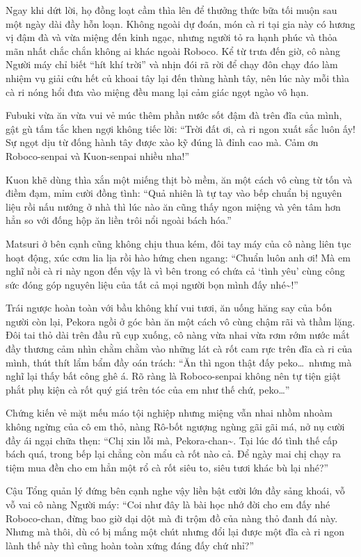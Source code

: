 \documentclass[../main.tex]{subfiles}
\begin{document}
Ngay khi dứt lời, họ đồng loạt cầm thìa lên để thưởng thức bữa tối muộn sau một ngày dài đầy hỗn loạn. Không ngoài dự đoán, món cà ri tại gia này có hương vị đậm đà và vừa miệng đến kinh ngạc, nhưng người tỏ ra hạnh phúc và thỏa mãn nhất chắc chắn không ai khác ngoài Roboco. Kể từ trưa đến giờ, cô nàng Người máy chỉ biết ``hít khí trời'' và nhịn đói rã rời để chạy đôn chạy đáo làm nhiệm vụ giải cứu hết củ khoai tây lại đến thùng hành tây, nên lúc này mỗi thìa cà ri nóng hổi đưa vào miệng đều mang lại cảm giác ngọt ngào vô hạn.

Fubuki vừa ăn vừa vui vẻ múc thêm phần nước sốt đậm đà trên đĩa của mình, gật gù tấm tắc khen ngợi không tiếc lời: ``Trời đất ơi, cà ri ngon xuất sắc luôn ấy! Sự ngọt dịu từ đống hành tây được xào kỹ đúng là đỉnh cao mà. Cảm ơn Roboco-senpai và Kuon-senpai nhiều nha!''

Kuon khẽ dùng thìa xắn một miếng thịt bò mềm, ăn một cách vô cùng từ tốn và điềm đạm, mỉm cười đồng tình: ``Quả nhiên là tự tay vào bếp chuẩn bị nguyên liệu rồi nấu nướng ở nhà thì lúc nào ăn cũng thấy ngon miệng và yên tâm hơn hẳn so với đống hộp ăn liền trôi nổi ngoài bách hóa.''

Matsuri ở bên cạnh cũng không chịu thua kém, đôi tay máy của cô nàng liên tục hoạt động, xúc cơm lia lịa rồi hào hứng chen ngang: ``Chuẩn luôn anh ơi! Mà em nghĩ nồi cà ri này ngon đến vậy là vì bên trong có chứa cả `tình yêu' cùng công sức đóng góp nguyên liệu của tất cả mọi người bọn mình đấy nhé\~{}!''

Trái ngược hoàn toàn với bầu không khí vui tươi, ăn uống hăng say của bốn người còn lại, Pekora ngồi ở góc bàn ăn một cách vô cùng chậm rãi và thầm lặng. Đôi tai thỏ dài trên đầu rũ cụp xuống, cô nàng vừa nhai vừa rơm rớm nước mắt đầy thương cảm nhìn chằm chằm vào những lát cà rốt cam rực trên đĩa cà ri của mình, thút thít lẩm bẩm đầy oán trách: ``Ăn thì ngon thật đấy peko\dots\ nhưng mà nghĩ lại thấy bất công ghê á. Rõ ràng là Roboco-senpai không nên tự tiện giật phắt phụ kiện cà rốt quý giá trên tóc của em như thế chứ, peko\dots''

Chứng kiến vẻ mặt mếu máo tội nghiệp nhưng miệng vẫn nhai nhồm nhoàm không ngừng của cô em thỏ, nàng Rô-bốt ngượng ngùng gãi gãi má, nở nụ cười đầy ái ngại chữa thẹn: ``Chị xin lỗi mà, Pekora-chan\~{}. Tại lúc đó tình thế cấp bách quá, trong bếp lại chẳng còn mẩu cà rốt nào cả. Để ngày mai chị chạy ra tiệm mua đền cho em hẳn một rổ cà rốt siêu to, siêu tươi khác bù lại nhé?''

Cậu Tổng quản lý đứng bên cạnh nghe vậy liền bật cười lớn đầy sảng khoái, vỗ vỗ vai cô nàng Người máy: ``Coi như đây là bài học nhớ đời cho em đấy nhé Roboco-chan, đừng bao giờ dại dột mà đi trộm đồ của nàng thỏ đanh đá này. Nhưng mà thôi, dù có bị mắng một chút nhưng đổi lại được một đĩa cà ri ngon lành thế này thì cũng hoàn toàn xứng đáng đấy chứ nhỉ?''
\end{document}
